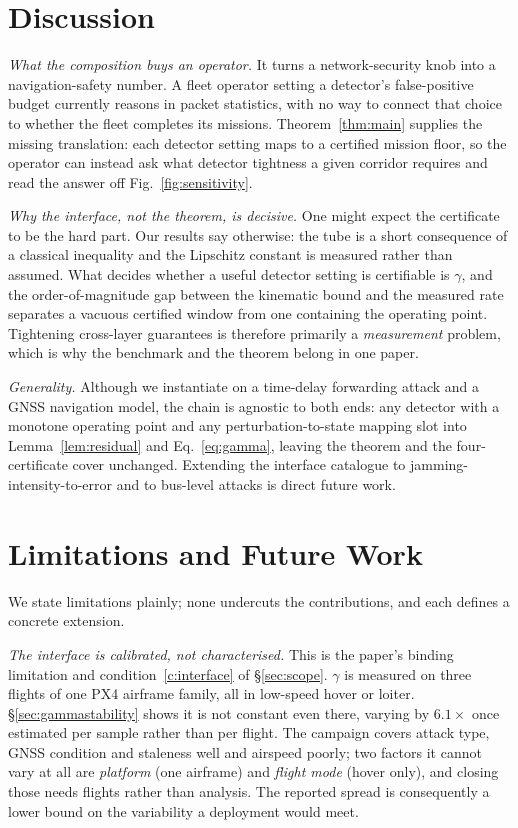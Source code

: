 \section{Discussion}
\label{sec:discussion}
\emph{What the composition buys an operator.} It turns a network-security knob
into a navigation-safety number. A fleet operator setting a detector's
false-positive budget currently reasons in packet statistics, with no way to
connect that choice to whether the fleet completes its missions.
Theorem~\ref{thm:main} supplies the
missing translation: each detector setting maps to a certified mission floor, so
the operator can instead ask what detector tightness a given corridor requires
and read the answer off Fig.~\ref{fig:sensitivity}.

\emph{Why the interface, not the theorem, is decisive.} One might expect the
certificate to be the hard part. Our results say otherwise: the tube is a short
consequence of a classical inequality and the Lipschitz constant is measured
rather than assumed. What decides whether a useful detector setting is
certifiable is $\gamma$, and the order-of-magnitude gap between the kinematic
bound and the measured rate separates a vacuous certified window from one
containing the operating point. Tightening cross-layer guarantees is therefore
primarily a \emph{measurement} problem, which is why the benchmark and the
theorem belong in one paper.

\emph{Generality.} Although we instantiate on a time-delay forwarding attack and
a GNSS navigation model, the chain is agnostic to both ends: any detector with a
monotone operating point and any perturbation-to-state mapping slot into
Lemma~\ref{lem:residual} and Eq.~\eqref{eq:gamma}, leaving the theorem and the
four-certificate cover unchanged. Extending the interface catalogue to
jamming-intensity-to-error and to bus-level attacks is direct future work.

\section{Limitations and Future Work}
\label{sec:limitations}
We state limitations plainly; none undercuts the contributions, and each defines
a concrete extension.

\emph{The interface is calibrated, not characterised.} This is the paper's
binding limitation and condition~\ref{c:interface} of \S\ref{sec:scope}.
$\gamma$ is measured on three flights of one PX4 airframe family, all in
low-speed hover or loiter. \S\ref{sec:gammastability} shows it is not constant
even there, varying by $6.1\times$ once estimated per sample rather than per
flight. The campaign covers attack type, GNSS condition and staleness well and
airspeed poorly; two factors it cannot vary at all are \emph{platform} (one
airframe) and \emph{flight mode} (hover only), and closing those needs flights
rather than analysis. The reported spread is
consequently a lower bound on the variability a deployment would meet.

